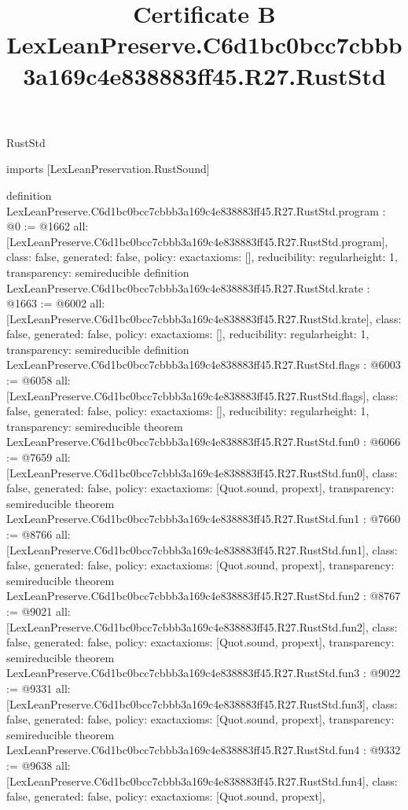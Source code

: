 \begin{lexlean}{RustStd}
\title{Certificate B LexLeanPreserve.C6d1bc0bcc7cbbb3a169c4e838883ff45.R27.RustStd}
\begin{coremodule}
imports [LexLeanPreservation.RustSound]

definition LexLeanPreserve.C6d1bc0bcc7cbbb3a169c4e838883ff45.R27.RustStd.program : @0 := @1662 {
  all: [LexLeanPreserve.C6d1bc0bcc7cbbb3a169c4e838883ff45.R27.RustStd.program],
  class: false,
  generated: false,
  policy: exact{axioms: []},
  reducibility: regular{height: 1},
  transparency: semireducible
}
definition LexLeanPreserve.C6d1bc0bcc7cbbb3a169c4e838883ff45.R27.RustStd.krate : @1663 := @6002 {
  all: [LexLeanPreserve.C6d1bc0bcc7cbbb3a169c4e838883ff45.R27.RustStd.krate],
  class: false,
  generated: false,
  policy: exact{axioms: []},
  reducibility: regular{height: 1},
  transparency: semireducible
}
definition LexLeanPreserve.C6d1bc0bcc7cbbb3a169c4e838883ff45.R27.RustStd.flags : @6003 := @6058 {
  all: [LexLeanPreserve.C6d1bc0bcc7cbbb3a169c4e838883ff45.R27.RustStd.flags],
  class: false,
  generated: false,
  policy: exact{axioms: []},
  reducibility: regular{height: 1},
  transparency: semireducible
}
theorem LexLeanPreserve.C6d1bc0bcc7cbbb3a169c4e838883ff45.R27.RustStd.fun0 : @6066 := @7659 {
  all: [LexLeanPreserve.C6d1bc0bcc7cbbb3a169c4e838883ff45.R27.RustStd.fun0],
  class: false,
  generated: false,
  policy: exact{axioms: [Quot.sound, propext]},
  transparency: semireducible
}
theorem LexLeanPreserve.C6d1bc0bcc7cbbb3a169c4e838883ff45.R27.RustStd.fun1 : @7660 := @8766 {
  all: [LexLeanPreserve.C6d1bc0bcc7cbbb3a169c4e838883ff45.R27.RustStd.fun1],
  class: false,
  generated: false,
  policy: exact{axioms: [Quot.sound, propext]},
  transparency: semireducible
}
theorem LexLeanPreserve.C6d1bc0bcc7cbbb3a169c4e838883ff45.R27.RustStd.fun2 : @8767 := @9021 {
  all: [LexLeanPreserve.C6d1bc0bcc7cbbb3a169c4e838883ff45.R27.RustStd.fun2],
  class: false,
  generated: false,
  policy: exact{axioms: [Quot.sound, propext]},
  transparency: semireducible
}
theorem LexLeanPreserve.C6d1bc0bcc7cbbb3a169c4e838883ff45.R27.RustStd.fun3 : @9022 := @9331 {
  all: [LexLeanPreserve.C6d1bc0bcc7cbbb3a169c4e838883ff45.R27.RustStd.fun3],
  class: false,
  generated: false,
  policy: exact{axioms: [Quot.sound, propext]},
  transparency: semireducible
}
theorem LexLeanPreserve.C6d1bc0bcc7cbbb3a169c4e838883ff45.R27.RustStd.fun4 : @9332 := @9638 {
  all: [LexLeanPreserve.C6d1bc0bcc7cbbb3a169c4e838883ff45.R27.RustStd.fun4],
  class: false,
  generated: false,
  policy: exact{axioms: [Quot.sound, propext]},
}
\end{coremodule}
\end{lexlean}
